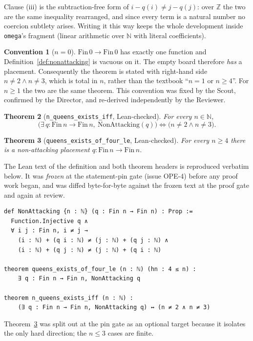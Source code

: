 \documentclass[11pt,a4paper]{article}
\newtheorem{theorem}{Theorem}[section]
\theoremstyle{definition}
\newtheorem{convention}[theorem]{Convention}
\theoremstyle{remark}
\newcommand{\lean}[1]{\texttt{#1}}
\newcommand{\N}{\mathbb{N}}
\newcommand{\Fin}{\mathrm{Fin}\,}
\newcommand{\NonAttacking}{\mathrm{NonAttacking}}
\begin{document}
Clause (iii) is the subtraction-free form of $i-q(i)\neq j-q(j)$: over $\mathbb{Z}$ the
two are the same inequality rearranged, and since every term is a natural number no
coercion subtlety arises. Writing it this way keeps the whole development inside
\lean{omega}'s fragment (linear arithmetic over $\N$ with literal coefficients).

\begin{convention}[$n=0$]
\label{conv:zero}
$\Fin 0\to\Fin 0$ has exactly one function and Definition~\ref{def:nonattacking} is
vacuous on it. The empty board therefore \emph{has} a placement. Consequently the theorem
is stated with right-hand side $n\neq 2\wedge n\neq 3$, which is total in $n$, rather
than the textbook ``$n=1$ or $n\ge 4$''. For $n\ge 1$ the two are the same theorem. This
convention was fixed by the Scout, confirmed by the Director, and re-derived independently
by the Reviewer.
\end{convention}

\begin{theorem}[\lean{n\_queens\_exists\_iff}, Lean-checked]
\label{thm:main}
For every $n\in\N$,
\[
\bigl(\exists\, q:\Fin n\to\Fin n,\ \NonAttacking(q)\bigr)\iff\bigl(n\neq 2\wedge n\neq 3\bigr).
\]
\end{theorem}

\begin{theorem}[\lean{queens\_exists\_of\_four\_le}, Lean-checked]
\label{thm:four}
For every $n\ge 4$ there is a non-attacking placement $q:\Fin n\to\Fin n$.
\end{theorem}

The Lean text of the definition and both theorem headers is reproduced verbatim below. It
was \emph{frozen} at the statement-pin gate (issue OPE-4) before any proof work began, and
was diffed byte-for-byte against the frozen text at the proof gate and again at review.

\begin{Verbatim}
def NonAttacking {n : ℕ} (q : Fin n → Fin n) : Prop :=
  Function.Injective q ∧
  ∀ i j : Fin n, i ≠ j →
    (i : ℕ) + (q i : ℕ) ≠ (j : ℕ) + (q j : ℕ) ∧
    (i : ℕ) + (q j : ℕ) ≠ (j : ℕ) + (q i : ℕ)

theorem queens_exists_of_four_le (n : ℕ) (hn : 4 ≤ n) :
    ∃ q : Fin n → Fin n, NonAttacking q

theorem n_queens_exists_iff (n : ℕ) :
    (∃ q : Fin n → Fin n, NonAttacking q) ↔ (n ≠ 2 ∧ n ≠ 3)
\end{Verbatim}

Theorem~\ref{thm:four} was split out at the pin gate as an optional target because it
isolates the only hard direction; the $n\le 3$ cases are finite.
\end{document}

